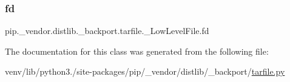 \subsubsection{\texorpdfstring{fd}{fd}}
{\footnotesize\ttfamily pip.\+\_\+vendor.\+distlib.\+\_\+backport.\+tarfile.\+\_\+\+Low\+Level\+File.\+fd}



The documentation for this class was generated from the following file\+:\begin{DoxyCompactItemize}
\item 
venv/lib/python3./site-\/packages/pip/\+\_\+vendor/distlib/\+\_\+backport/\hyperlink{tarfile_8py}{tarfile.\+py}\end{DoxyCompactItemize}
